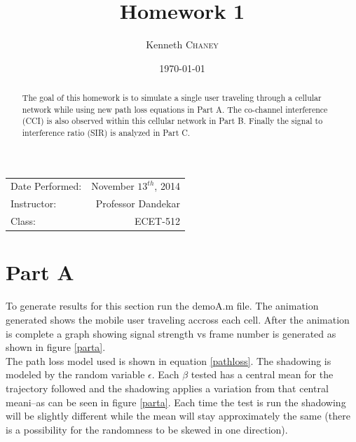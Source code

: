 \documentclass{article}
\title{Homework 1} %
\author{Kenneth \textsc{Chaney}} %
\date{\today} %
\begin{document}
\maketitle %

\begin{center}
\begin{tabular}{l r}
Date Performed: & November \(13^{th}\), 2014 \\ %
Instructor: & Professor Dandekar \\ %
Class: & ECET-512
\end{tabular}
\end{center}

\begin{abstract}
The goal of this homework is to simulate a single user traveling through a cellular network while using new path loss equations in Part A. The co-channel interference (CCI) is also observed within this cellular network in Part B. Finally the signal to interference ratio (SIR) is analyzed in Part C.

\end{abstract}

\pagebreak

\section{Part A}\label{partA}

To generate results for this section run the demoA.m file. The animation generated shows the mobile user traveling accross each cell. After the animation is complete a graph showing signal strength vs frame number is generated as shown in figure \ref{parta}. \\ 

The path loss model used is shown in equation \ref{pathloss}. The shadowing is modeled by the random variable \( \epsilon \). Each \( \beta \) tested has a central mean for the trajectory followed and the shadowing applies a variation from that central meani--as can be seen in figure \ref{parta}. Each time the test is run the shadowing will be slightly different while the mean will stay approximately the same (there is a possibility for the randomness to be skewed in one direction). \\
\end{document}
